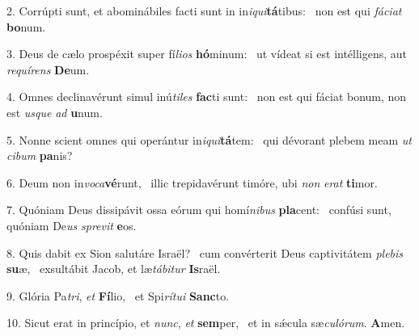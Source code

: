 2. Corrúpti sunt, et abominábiles facti sunt in in\textit{i}\textit{qui}\textbf{tá}tibus: \ast\  non est qui \textit{fá}\textit{ci}\textit{at} \textbf{bo}num.\

3. Deus de cælo prospéxit super fí\textit{li}\textit{os} \textbf{hó}minum: \ast\  ut vídeat si est intélligens, aut \textit{re}\textit{quí}\textit{rens} \textbf{De}um.\

4. Omnes declinavérunt simul inú\textit{ti}\textit{les} \textbf{fac}ti sunt: \ast\  non est qui fáciat bonum, non est \textit{us}\textit{que} \textit{ad} \textbf{u}num.\

5. Nonne scient omnes qui operántur in\textit{i}\textit{qui}\textbf{tá}tem: \ast\  qui dévorant plebem meam \textit{ut} \textit{ci}\textit{bum} \textbf{pa}nis?\

6. Deum non in\textit{vo}\textit{ca}\textbf{vé}runt, \ast\  illic trepidavérunt timóre, ubi \textit{non} \textit{e}\textit{rat} \textbf{ti}mor.\

7. Quóniam Deus dissipávit ossa eórum qui homí\textit{ni}\textit{bus} \textbf{pla}cent: \ast\  confúsi sunt, quóniam De\textit{us} \textit{spre}\textit{vit} \textbf{e}os.\

8. Quis dabit ex Sion salutáre Israël? \dag\  cum convérterit Deus captivitátem \textit{ple}\textit{bis} \textbf{su}æ, \ast\  exsultábit Jacob, et læ\textit{tá}\textit{bi}\textit{tur} \textbf{Is}raël.\

9. Glória Pa\textit{tri}, \textit{et} \textbf{Fí}lio, \ast\  et Spi\textit{rí}\textit{tu}\textit{i} \textbf{Sanc}to.\

10. Sicut erat in princípio, et \textit{nunc}, \textit{et} \textbf{sem}per, \ast\  et in sǽcula sæ\textit{cu}\textit{ló}\textit{rum}. \textbf{A}men.\

